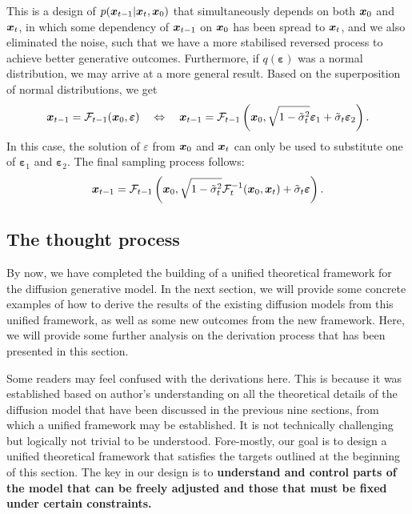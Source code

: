 This is a design of $p(\bm{x}_{t-1}|\bm{x}_{t},\bm{x}_0 ) $ that simultaneously depends on both $\bm{x}_0$ and $\bm{x}_{t}$, in which some dependency of $\bm{x}_{t-1}$ on $\bm{x}_0$ has been spread to $\bm{x}_{t}$, and we also eliminated the noise, such that we have a more stabilised reversed process to achieve better generative outcomes. Furthermore, if $q(\bm{\varepsilon})$ was a normal distribution, we may arrive at a more general result. Based on the superposition of normal distributions, we get
\begin{equation}
    \label{eq:10:12}
    \bm{x}_{t-1}=\mathcal{F}_{t-1}(\bm{x}_0,\bm{\varepsilon})\quad\Leftrightarrow\quad \bm{x}_{t-1}=\mathcal{F}_{t-1}\left(\bm{x}_0, \sqrt{1-\tilde{\sigma}_t^2}\bm{\varepsilon}_1+ \tilde{\sigma}_t\bm{\varepsilon}_2\right).
\end{equation}
In this case, the solution of $\varepsilon$ from $\bm{x}_0$ and $\bm{x}_{t}$ can only be used to substitute one of $\bm{\varepsilon}_1$ and $\bm{\varepsilon}_2$. The final sampling process follows:
\begin{equation}
    \label{eq:10.13}
    \bm{x}_{t-1}=\mathcal{F}_{t-1}\left(\bm{x}_0, \sqrt{1-\tilde{\sigma}_t^2} \mathcal{F}_t^{-1}(\bm{x}_0,\bm{x}_{t}) + \tilde{\sigma}_t\bm{\varepsilon}\right).
\end{equation}

\subsection{The thought process}

By now, we have completed the building of a unified theoretical framework for the diffusion generative model. In the next section, we will provide some concrete examples of how to derive the results of the existing diffusion models from this unified framework, as well as some new outcomes from the new framework. Here, we will provide some further analysis on the derivation process that has been presented in this section.

Some readers may feel confused with the derivations here. This is because it was established based on author's understanding on all the theoretical details of the diffusion model that have been discussed in the previous nine sections, from which a unified framework may be established. It is not technically challenging but logically not trivial to be understood. Fore-mostly, our goal is to design a unified theoretical framework that satisfies the targets outlined at the beginning of this section. The key in our design is to \textbf{understand and control parts of the model that can be freely adjusted and those that must be fixed under certain constraints.}

